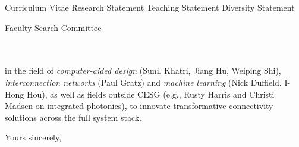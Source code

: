 



\addAttach%
{Curriculum Vitae}%
{Research Statement}%
{Teaching Statement}%
{Diversity Statement}
\def\appSpecific{with significant implications for the research fields related to Computer Engineering \& Systems Group (CESG)}
\def\letterCustom{%
    in the field of \emph{computer-aided design} (Sunil Khatri, Jiang Hu, Weiping Shi), \emph{interconnection networks} (Paul Gratz) and \emph{machine learning} (Nick Duffield, I-Hong Hou), as well as fields outside CESG (e.g., Rusty Harris and Christi Madsen on integrated photonics), to innovate transformative connectivity solutions across the full system stack.%
}

\def\appJobID{%
    \ifthenelse{\equal{\jobID}{}}{\unskip}{\unskip\textemdash Job \# \jobID{}}%
}
\def\toAddr{%
Faculty Search Committee \\ \appDept{} \\ \appSchool{} \\ \appAddr{}%
}

\begin{letter}{\toAddr{}}
    \opening{\myOpening{}}
    
    \letterCustom{}
    
    \closing{Yours sincerely,}
    \encl{\listAttach{}}
\end{letter}
